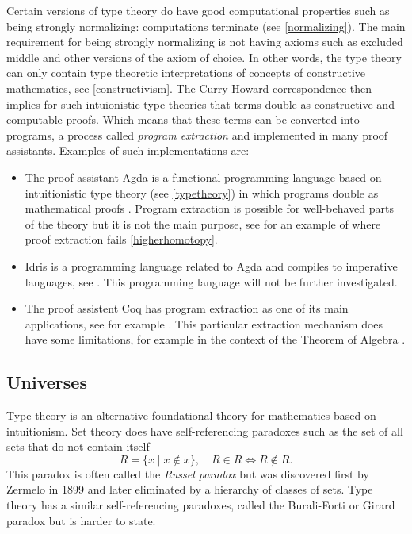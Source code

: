 \documentclass[12pt,a4paper,twoside,xetex]{book} %
\newcommand{\keyword}[1]{\emph{#1}\index{#1}}
\begin{document}
Certain versions of type theory do have good computational properties such as 
being strongly normalizing: computations terminate (see \cref{normalizing}). 
The main requirement for being strongly normalizing is not having axioms such 
as excluded middle and other versions of the axiom of choice. In other words, 
the type theory can only contain type theoretic interpretations of concepts of 
constructive mathematics, see \cref{constructivism}. The Curry-Howard 
correspondence then implies for such intuionistic type theories that terms 
double as constructive and computable proofs. Which means that these terms can 
be converted into programs, a process called \keyword{program extraction} and 
implemented in many proof assistants. Examples of such implementations are:
\begin{itemize}
\item The proof assistant Agda is a functional programming language based on 
intuitionistic type theory (see \cref{typetheory}) in which programs double as 
mathematical proofs \cite{Abel2019}. Program extraction is possible for 
well-behaved parts of the theory but it is not the main purpose, see for an example of where proof extraction fails \cref{higherhomotopy}.
\item Idris is a programming language related to Agda and compiles to imperative 
languages, see \cite{Brady2018}. This programming language will not be further investigated.
\item   The proof assistent Coq \cite{Arias2019} has program extraction as one 
of its main applications, see for example \cite{Pit-Claudel2018}. This 
particular extraction mechanism does have some limitations, for example in the 
context of the Theorem of Algebra \cite{Cruz-Filipe2005}.
\end{itemize}


\subsection{Universes}\label{universes}

Type theory is an alternative foundational theory for mathematics based on intuitionism. Set theory does have self-referencing paradoxes such as the set of all sets that do not contain itself \[ R = \{x \mid x \not \in x \}, \quad R\in R \Leftrightarrow R \not \in R. \] This paradox is often called the \keyword{Russel paradox} but was discovered first by Zermelo in 1899 and later eliminated by a hierarchy of classes of sets. Type theory has a similar self-referencing paradoxes, called the Burali-Forti or Girard paradox but is harder to state.
\end{document}
